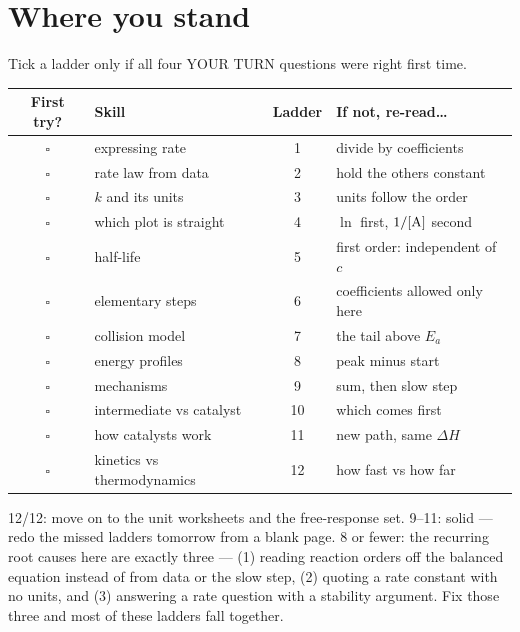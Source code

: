 \documentclass{apchem-worksheet}
\begin{document}
\section*{\sffamily Where you stand}

Tick a ladder only if all four YOUR TURN questions were right first time.

\renewcommand{\arraystretch}{1.30}
\noindent\begin{tabular}{@{}c p{6.0cm} c >{\raggedright\arraybackslash}p{4.9cm}@{}}
\toprule
\textbf{First try?} & \textbf{Skill} & \textbf{Ladder} &
  \textbf{If not, re-read\ldots}\\
\midrule
$\square$ & expressing rate & 1 & divide by coefficients \\
$\square$ & rate law from data & 2 & hold the others constant \\
$\square$ & $k$ and its units & 3 & units follow the order \\
$\square$ & which plot is straight & 4 & $\ln$ first, $1/[\ce{A}]$ second \\
$\square$ & half-life & 5 & first order: independent of $c$ \\
$\square$ & elementary steps & 6 & coefficients allowed only here \\
$\square$ & collision model & 7 & the tail above $E_a$ \\
$\square$ & energy profiles & 8 & peak minus start \\
$\square$ & mechanisms & 9 & sum, then slow step \\
$\square$ & intermediate vs catalyst & 10 & which comes first \\
$\square$ & how catalysts work & 11 & new path, same $\Delta H$ \\
$\square$ & kinetics vs thermodynamics & 12 & how fast vs how far \\
\bottomrule
\end{tabular}

\begin{apcnote}
12/12: move on to the unit worksheets and the free-response set.
9--11: solid --- redo the missed ladders tomorrow from a blank page.
8 or fewer: the recurring root causes here are exactly three ---
(1) reading reaction orders off the balanced equation instead of from
data or the slow step, (2) quoting a rate constant with no units, and
(3) answering a rate question with a stability argument. Fix those three
and most of these ladders fall together.
\end{apcnote}
\end{document}
